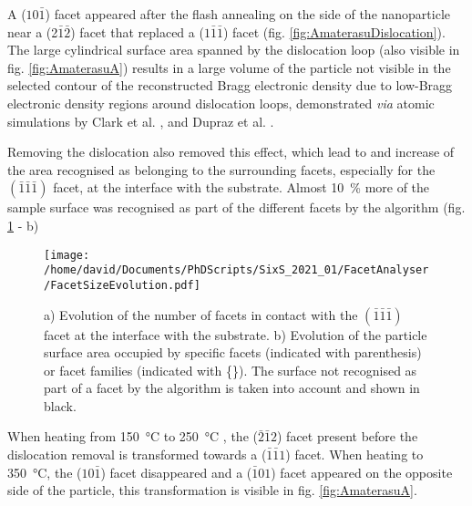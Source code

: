 A ($10\bar{1}$) facet appeared after the flash annealing on the side of the nanoparticle near a (2$\bar{1}\bar{2}$) facet that replaced a ($1\bar{1}\bar{1}$) facet (fig. \ref{fig:AmaterasuDislocation}).
The large cylindrical surface area spanned by the dislocation loop (also visible in fig. \ref{fig:AmaterasuA}) results in a large volume of the particle not visible in the selected contour of the reconstructed Bragg electronic density due to low-Bragg electronic density regions around dislocation loops, demonstrated \textit{via} atomic simulations by Clark et al. \parencite*{Clark2015}, and Dupraz et al. \parencite*{Dupraz2017}.

Removing the dislocation also removed this effect, which lead to and increase of the area recognised as belonging to the surrounding facets, especially for the $(\bar{1}\bar{1}\bar{1})$ facet, at the interface with the substrate.
Almost \qty{10}{\percent} more of the sample surface was recognised as part of the different facets by the algorithm (fig. \ref{fig:AmaterasuFacetsEvolution} - b)

\begin{figure}[!htb]
    \centering
    \texttt{[image: /home/david/Documents/PhDScripts/SixS\_2021\_01/FacetAnalyser/FacetSizeEvolution.pdf]}
    \caption{
        a) Evolution of the number of facets in contact with the $(\bar{1}\bar{1}\bar{1})$ facet at the interface with the substrate.
        b) Evolution of the particle surface area occupied by specific facets (indicated with parenthesis) or facet families (indicated with \{\}).
        The surface not recognised as part of a facet by the algorithm is taken into account and shown in black.
    }
    \label{fig:AmaterasuFacetsEvolution}
\end{figure}

When heating from \qty{150}{\degreeCelsius} to \qty{250}{\degreeCelsius} , the ($\bar{2}\bar{1}2$) facet present before the dislocation removal is transformed towards a ($\bar{1}\bar{1}1$) facet.
When heating to \qty{350}{\degreeCelsius}, the ($10\bar{1}$) facet disappeared and a ($\bar{1}01$) facet appeared on the opposite side of the particle, this transformation is visible in fig. \ref{fig:AmaterasuA}.

